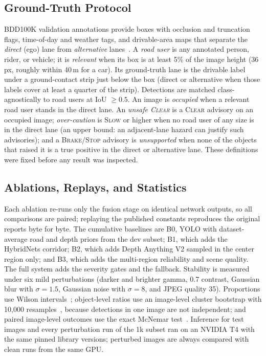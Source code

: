 \documentclass[conference,a4paper]{IEEEtran}
\newcommand{\st}[1]{\textsc{#1}}
\begin{document}
\subsection{Ground-Truth Protocol}
BDD100K validation annotations provide boxes with occlusion and truncation flags, time-of-day and weather tags, and drivable-area maps that separate the \emph{direct} (ego) lane from \emph{alternative} lanes~\cite{bdd100k}. A \emph{road user} is any annotated person, rider, or vehicle; it is \emph{relevant} when its box is at least 5\% of the image height (36\,px, roughly within 40\,m for a car). Its ground-truth lane is the drivable label under a ground-contact strip just below the box (direct or alternative when those labels cover at least a quarter of the strip). Detections are matched class-agnostically to road users at IoU $\ge 0.5$. An image is \emph{occupied} when a relevant road user stands in the direct lane. An \emph{unsafe \st{Clear}} is a \st{Clear} advisory on an occupied image; \emph{over-caution} is \st{Slow} or higher when no road user of any size is in the direct lane (an upper bound: an adjacent-lane hazard can justify such advisories); and a \st{Brake}/\st{Stop} advisory is \emph{unsupported} when none of the objects that raised it is a true positive in the direct or alternative lane. These definitions were fixed before any result was inspected.

\subsection{Ablations, Replays, and Statistics}
Each ablation re-runs only the fusion stage on identical network outputs, so all comparisons are paired; replaying the published constants reproduces the original reports byte for byte. The cumulative baselines are B0, YOLO with dataset-average road and depth priors from the dev subset; B1, which adds the HybridNets corridor; B2, which adds Depth Anything V2 sampled in the center region only; and B3, which adds the multi-region reliability and scene quality. The full system adds the severity gates and the fallback. Stability is measured under six mild perturbations (darker and brighter gamma, 0.7 contrast, Gaussian blur with $\sigma=1.5$, Gaussian noise with $\sigma=8$, and JPEG quality 35). Proportions use Wilson intervals~\cite{wilson1927}; object-level ratios use an image-level cluster bootstrap with 10{,}000 resamples~\cite{efron1993}, because detections in one image are not independent; and paired image-level outcomes use the exact McNemar test~\cite{mcnemar1947}.\ifdefined\TestTFourImages{} Inference for \TestTFourImages{} test images and every perturbation run of the 1k subset ran on an NVIDIA T4 with the same pinned library versions; perturbed images are always compared with clean runs from the same GPU.\fi
\end{document}
